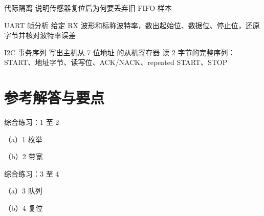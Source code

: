 \begin{chapterexercise}{代际隔离}
说明传感器复位后为何要丢弃旧 FIFO 样本
\end{chapterexercise}

\begin{chapterexercise}{UART 帧分析}
给定 RX 波形和标称波特率，数出起始位、数据位、停止位，还原字节并核对波特率误差
\end{chapterexercise}

\begin{chapterexercise}{I2C 事务序列}
写出主机从 7 位地址  的从机寄存器  读 2 字节的完整序列：START、地址字节、读写位、ACK/NACK、repeated START、STOP
\end{chapterexercise}

\section*{参考解答与要点}

\begin{chapteranswer}{综合练习：1 至 2}
\begin{answersubproblem}{（a）1}
枚举
\end{answersubproblem}
\begin{answersubproblem}{（b）2}
带宽
\end{answersubproblem}
\end{chapteranswer}

\begin{chapteranswer}{综合练习：3 至 4}
\begin{answersubproblem}{（a）3}
队列
\end{answersubproblem}
\begin{answersubproblem}{（b）4}
复位
\end{answersubproblem}
\end{chapteranswer}

